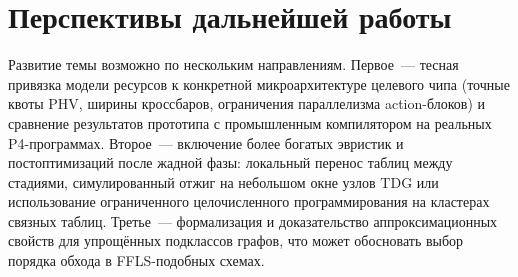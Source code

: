 \section{Перспективы дальнейшей работы}
\label{sec:Chapter8} 

Развитие темы возможно по нескольким направлениям. Первое~--- тесная привязка модели ресурсов к конкретной микроархитектуре целевого чипа (точные квоты PHV, ширины кроссбаров, ограничения параллелизма action-блоков) и сравнение результатов прототипа с промышленным компилятором на реальных P4-программах. Второе~--- включение более богатых эвристик и постоптимизаций после жадной фазы: локальный перенос таблиц между стадиями, симулированный отжиг на небольшом окне узлов TDG или использование ограниченного целочисленного программирования на кластерах связных таблиц. Третье~--- формализация и доказательство аппроксимационных свойств для упрощённых подклассов графов, что может обосновать выбор порядка обхода в FFLS-подобных схемах.
